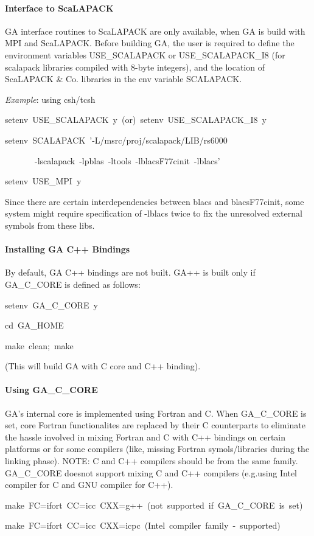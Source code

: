 \paragraph{Interface to ScaLAPACK}

GA interface routines to ScaLAPACK are only available, when GA is
build with MPI and ScaLAPACK. Before building GA, the user is required
to define the environment variables USE\_SCALAPACK or USE\_SCALAPACK\_I8
(for scalapack libraries compiled with 8-byte integers), and the location
of ScaLAPACK \& Co. libraries in the env variable SCALAPACK.

\emph{Example}: using csh/tcsh
\begin{lyxcode}
setenv~USE\_SCALAPACK~y~(or)~setenv~USE\_SCALAPACK\_I8~y~

setenv~SCALAPACK~'-L/msrc/proj/scalapack/LIB/rs6000~

~~~~~~~-lscalapack~-lpblas~-ltools~-lblacsF77cinit~-lblacs'~

setenv~USE\_MPI~y
\end{lyxcode}
Since there are certain interdependencies between blacs and blacsF77cinit,
some system might require specification of -lblacs twice to fix the
unresolved external symbols from these libs.


\paragraph{Installing GA C++ Bindings}

By default, GA C++ bindings are not built. GA++ is built only if GA\_C\_CORE
is defined as follows: 
\begin{lyxcode}
setenv~GA\_C\_CORE~y~

cd~GA\_HOME~

make~clean;~make~
\end{lyxcode}
(This will build GA with C core and C++ binding).


\paragraph{Using GA\_C\_CORE}

GA's internal core is implemented using Fortran and C. When GA\_C\_CORE
is set, core Fortran functionalites are replaced by their C counterparts
to eliminate the hassle involved in mixing Fortran and C with C++
bindings on certain platforms or for some compilers (like, missing
Fortran symols/libraries during the linking phase). NOTE: C and C++
compilers should be from the same family. GA\_C\_CORE doesnot support
mixing C and C++ compilers (e.g.using Intel compiler for C and GNU
compiler for C++). 
\begin{lyxcode}
make~FC=ifort~CC=icc~CXX=g++~(not~supported~if~GA\_C\_CORE~is~set)~

make~FC=ifort~CC=icc~CXX=icpc~(Intel~compiler~family~-~supported)
\end{lyxcode}

